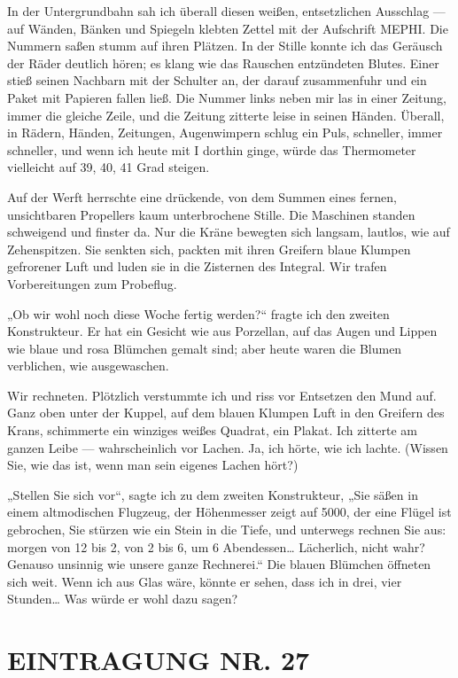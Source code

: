 In der Untergrundbahn sah ich überall diesen weißen, entsetzlichen
Ausschlag — auf Wänden, Bänken und Spiegeln klebten Zettel mit der
Aufschrift MEPHI. Die Nummern saßen stumm auf ihren Plätzen. In der
Stille konnte ich das Geräusch der Räder deutlich hören; es klang
wie das Rauschen entzündeten Blutes. Einer stieß seinen Nachbarn
mit der Schulter an, der darauf zusammenfuhr und ein Paket mit
Papieren fallen ließ. Die Nummer links neben mir las in einer
Zeitung, immer die gleiche Zeile, und die Zeitung zitterte leise in
seinen Händen. Überall, in Rädern, Händen, Zeitungen, Augenwimpern
schlug ein Puls, schneller, immer schneller, und wenn ich heute mit
I dorthin ginge, würde das Thermometer vielleicht auf 39, 40, 41
Grad steigen.

Auf der Werft herrschte eine drückende, von dem Summen eines
fernen, unsichtbaren Propellers kaum unterbrochene Stille. Die
Maschinen standen schweigend und finster da. Nur die Kräne bewegten
sich langsam, lautlos, wie auf Zehenspitzen. Sie senkten sich,
packten mit ihren Greifern
blaue Klumpen gefrorener Luft und luden sie in die Zisternen des
Integral. Wir trafen Vorbereitungen zum Probeflug.

„Ob wir wohl noch diese Woche fertig werden?“ fragte ich den
zweiten Konstrukteur. Er hat ein Gesicht wie aus Porzellan, auf das
Augen und Lippen wie blaue und rosa Blümchen gemalt sind; aber
heute waren die Blumen verblichen, wie ausgewaschen.

Wir rechneten. Plötzlich verstummte ich und riss vor Entsetzen den
Mund auf. Ganz oben unter der Kuppel, auf dem blauen Klumpen Luft
in den Greifern des Krans, schimmerte ein winziges weißes Quadrat,
ein Plakat. Ich zitterte am ganzen Leibe — wahrscheinlich vor
Lachen. Ja, ich hörte, wie ich lachte. (Wissen Sie, wie das ist,
wenn man sein eigenes Lachen hört?)

„Stellen Sie sich vor“, sagte ich zu dem zweiten Konstrukteur, „Sie
säßen in einem altmodischen Flugzeug, der Höhenmesser zeigt auf
5000, der eine Flügel ist gebrochen, Sie stürzen wie ein Stein in
die Tiefe, und unterwegs rechnen Sie aus: morgen von 12 bis 2, von
2 bis 6, um 6 Abendessen\ldots{} Lächerlich, nicht wahr? Genauso
unsinnig wie unsere ganze Rechnerei.“ Die blauen Blümchen öffneten
sich weit. Wenn ich aus Glas wäre, könnte er sehen, dass ich in
drei, vier Stunden\ldots{} Was würde er wohl dazu sagen?

\section{EINTRAGUNG NR. 27}

